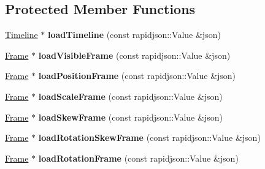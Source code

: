 \subsection*{Protected Member Functions}
\begin{DoxyCompactItemize}
\item 
\mbox{\label{classActionTimelineCache_a29005180d05dfcca3f62417db4818691}} 
\hyperlink{classTimeline}{Timeline} $\ast$ {\bfseries load\+Timeline} (const rapidjson\+::\+Value \&json)
\item 
\mbox{\label{classActionTimelineCache_abf14b1a42aeb29186603a7d4e5e4cf3f}} 
\hyperlink{structflatbuffers_1_1Frame}{Frame} $\ast$ {\bfseries load\+Visible\+Frame} (const rapidjson\+::\+Value \&json)
\item 
\mbox{\label{classActionTimelineCache_ae62a9bc2a1013c56961cbbebcb8357c7}} 
\hyperlink{structflatbuffers_1_1Frame}{Frame} $\ast$ {\bfseries load\+Position\+Frame} (const rapidjson\+::\+Value \&json)
\item 
\mbox{\label{classActionTimelineCache_affd521fed6bec5a82c207fa3bf5f2650}} 
\hyperlink{structflatbuffers_1_1Frame}{Frame} $\ast$ {\bfseries load\+Scale\+Frame} (const rapidjson\+::\+Value \&json)
\item 
\mbox{\label{classActionTimelineCache_ab3435a3ac24a2db5735a07d5a7455285}} 
\hyperlink{structflatbuffers_1_1Frame}{Frame} $\ast$ {\bfseries load\+Skew\+Frame} (const rapidjson\+::\+Value \&json)
\item 
\mbox{\label{classActionTimelineCache_a53f2148f5d5aa93b942e991fdad3f683}} 
\hyperlink{structflatbuffers_1_1Frame}{Frame} $\ast$ {\bfseries load\+Rotation\+Skew\+Frame} (const rapidjson\+::\+Value \&json)
\item 
\mbox{\label{classActionTimelineCache_ac1b6a9303516d304810e2864093eb4d8}} 
\hyperlink{structflatbuffers_1_1Frame}{Frame} $\ast$ {\bfseries load\+Rotation\+Frame} (const rapidjson\+::\+Value \&json)
\item 
\mbox{\label{classActionTimelineCache_afc7cd8b9488aeecb25c7f49521dfd6c0}} 

\end{DoxyCompactItemize}
